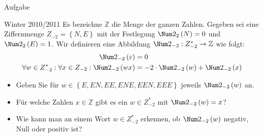 \begin{frame}{Aufgabe}
    \begin{exampleblock}{Winter 2010/2011}
        Es bezeichne $\mathbb{Z}$ die Menge der ganzen Zahlen. Gegeben sei eine Ziffernmenge $Z_{-2} = \left\{ N, E \right\}$ mit der Festlegung $\Num2_2\left( N \right) = 0$ und $\Num2_2\left( E \right) = 1$. Wir definieren eine Abbildung $\Num2_{-2}: Z_{-2}^* \rightarrow \mathbb{Z}$ wie folgt:
        \begin{align*}
            \Num2_{-2}\left( \varepsilon \right) &= 0\\
            \forall w \in Z_{-2}^*: \forall x \in Z_{-2}: \Num2_{-2}\left( wx \right) &= -2\cdot \Num2_{-2}\left( w \right) + \Num2_{-2}\left( x \right)
        \end{align*}
        \begin{itemize}
            \item Geben Sie für $w \in \left\{ E, EN, EE, ENE, EEN, EEE\right\}$ jeweils $\Num2_{-2}\left( w \right)$ an.
            \item Für welche Zahlen $x\in\mathbb{Z}$ gibt es ein $w \in Z_{-2}^*$ mit $\Num2_{-2}\left( w \right) = x$?
            \item Wie kann man an einem Wort $w \in Z_{-2}^*$ erkennen, ob $\Num2_{-2}\left( w \right)$ negativ, Null oder positiv ist?
        \end{itemize}
    \end{exampleblock}
\end{frame}

